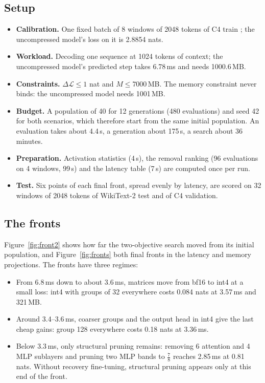 \documentclass[11pt]{article}
\newcommand{\dloss}{\Delta\mathcal{L}}
\begin{document}
\subsection{Setup}
\begin{itemize}
  \item \textbf{Calibration.} One fixed batch of 8 windows of 2048 tokens of C4 train \cite{raffel2020c4};
        the uncompressed model's loss on it is 2.8854 nats.
  \item \textbf{Workload.} Decoding one sequence at 1024 tokens of context; the uncompressed model's
        predicted step takes 6.78\,ms and needs 1000.6\,MB.
  \item \textbf{Constraints.} $\dloss\le1$ nat and $M\le7000$\,MB. The memory constraint never binds:
        the uncompressed model needs 1001\,MB.
  \item \textbf{Budget.} A population of 40 for 12 generations (480 evaluations) and seed 42 for both
        scenarios, which therefore start from the same initial population. An evaluation takes about
        4.4\,s, a generation about 175\,s, a search about 36 minutes.
  \item \textbf{Preparation.} Activation statistics (4\,s), the removal ranking (96 evaluations on 4
        windows, 99\,s) and the latency table (7\,s) are computed once per run.
  \item \textbf{Test.} Six points of each final front, spread evenly by latency, are scored on 32
        windows of 2048 tokens of WikiText-2 test \cite{merity2017wikitext} and of C4 validation.
\end{itemize}

\subsection{The fronts}
Figure~\ref{fig:front2} shows how far the two-objective search moved from its initial population, and
Figure~\ref{fig:fronts} both final fronts in the latency and memory projections. The fronts have three
regimes:
\begin{itemize}
  \item From 6.8\,ms down to about 3.6\,ms, matrices move from bf16 to int4 at a small loss: int4 with
        groups of 32 everywhere costs 0.084 nats at 3.57\,ms and 321\,MB.
  \item Around 3.4--3.6\,ms, coarser groups and the output head in int4 give the last cheap gains:
        group 128 everywhere costs 0.18 nats at 3.36\,ms.
  \item Below 3.3\,ms, only structural pruning remains: removing 6 attention and 4 MLP sublayers and
        pruning two MLP bands to $\tfrac78$ reaches 2.85\,ms at 0.81 nats. Without recovery fine-tuning,
        structural pruning appears only at this end of the front.
\end{itemize}
\end{document}
